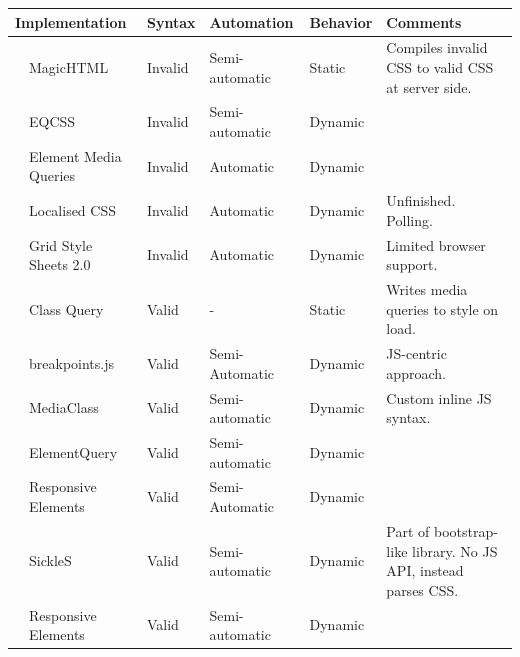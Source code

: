 \documentclass[a4paper,11pt]{kth-mag}
\begin{document}
    \begin{table}[ht]\center
      \tiny
      \begin{tabular}[t]{ l p{3cm} l l l p{3cm} }
        \multicolumn{2}{l}{Implementation} & Syntax & Automation & Behavior & Comments \\
        \hline
        \cite{eq_imp_magichtml} &             MagicHTML &                                   Invalid &   Semi-automatic &  Static &    Compiles invalid CSS to valid CSS at server side. \\
        \cite{eq_imp_eqcss} &                 EQCSS &                                       Invalid &   Semi-automatic &  Dynamic     \\
        \cite{eq_imp_prollyfill-min-width} &  Element Media Queries &                       Invalid &   Automatic &       Dynamic &   \\
        \cite{eq_imp_localised-css} &         Localised CSS &                               Invalid &   Automatic &       Dynamic &   Unfinished. Polling. \\
        \cite{eq_imp_gss} &                   Grid Style Sheets 2.0 &                       Invalid &   Automatic &       Dynamic &   Limited browser support. \\
        \cite{eq_imp_classquery} &            Class Query &                                 Valid &     - &               Static &    Writes media queries to style on load. \\
        \cite{eq_imp_breakpointsjs} &         breakpoints.js &                              Valid &     Semi-Automatic &  Dynamic &   JS-centric approach. \\
        \cite{eq_imp_mediaclass} &            MediaClass &                                  Valid &     Semi-automatic &  Dynamic &   Custom inline JS syntax. \\
        \cite{eq_imp_elementquery} &          ElementQuery &                                Valid &     Semi-automatic &  Dynamic &   \\
        \cite{eq_imp_responsive-elements} &   Responsive Elements &                         Valid &     Semi-Automatic &  Dynamic &   \\
        \cite{eq_imp_sickles} &               SickleS &                                     Valid &     Semi-automatic &  Dynamic &   Part of bootstrap-like library. No JS API, instead parses CSS. \\
        \cite{eq_imp_responsive-elements-2} & Responsive Elements &                         Valid &     Semi-automatic &  Dynamic &   \\

\end{tabular}
\end{table}
\end{document}
